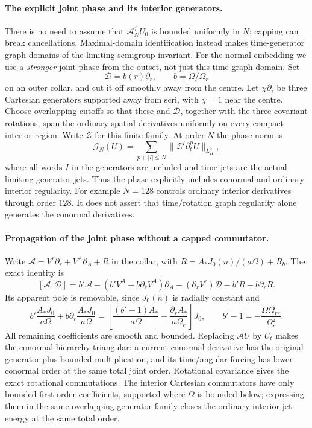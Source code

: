 \paragraph{The explicit joint phase and its interior generators.}
There is no need to assume that $\mathcal A_N^jU_0$ is bounded uniformly in
$N$; capping can break cancellations.  Maximal-domain identification instead
makes time-generator graph domains of the limiting semigroup invariant.
For the normal embedding we use a \emph{stronger} joint phase from the outset,
not just this time graph domain.  Set
\[
 \mathcal D=b(r)\partial_r,\qquad b=\Omega/\Omega_r
\]
on an outer collar, and cut it off smoothly away from the centre.  Let
$\chi\partial_i$ be three Cartesian generators supported away from scri,
with $\chi=1$ near the centre.  Choose overlapping cutoffs so that these
and $\mathcal D$, together with the three covariant rotations, span the
ordinary spatial derivatives uniformly on every compact interior region.
Write $\mathcal Z$ for this finite family.  At order $N$ the phase norm is
\[
 \mathcal G_N(U)=\sum_{p+|I|\le N}
  \|\mathcal Z^I\partial_t^pU\|_{L^2_H},
\]
where all words $I$ in the generators are included and time jets are the
actual limiting-generator jets.  Thus the phase explicitly includes
conormal and ordinary interior regularity.  For example $N=128$ controls
ordinary interior derivatives through order $128$.  It does not assert that
time/rotation graph regularity alone generates the conormal derivatives.

\paragraph{Propagation of the joint phase without a capped commutator.}
Write $\mathcal A=V^r\partial_r+V^A\partial_A+R$ in the collar, with
$R=A_*J_0(n)/(a\Omega)+R_b$.  The exact identity is
\[
 [\mathcal A,\mathcal D]=b'\mathcal A
 -(b'V^A+b\partial_rV^A)\partial_A
 -(\partial_rV^r)\mathcal D-b'R-b\partial_rR.
\]
Its apparent pole is removable, since $J_0(n)$ is radially constant and
\[
 b'\frac{A_*J_0}{a\Omega}
 +b\partial_r\frac{A_*J_0}{a\Omega}
 =\left[\frac{(b'-1)A_*}{a\Omega}
       +\frac{\partial_rA_*}{a\Omega_r}\right]J_0,
 \qquad b'-1=-\frac{\Omega\Omega_{rr}}{\Omega_r^2}.
\]
All remaining coefficients are smooth and bounded.  Replacing
$\mathcal AU$ by $U_t$ makes the conormal hierarchy triangular: a current
conormal derivative has the original generator plus bounded multiplication,
and its time/angular forcing has lower conormal order at the same total
joint order.  Rotational covariance gives the exact rotational commutations.
The interior Cartesian commutators have only bounded first-order
coefficients, supported where $\Omega$ is bounded below; expressing them in
the same overlapping generator family closes the ordinary interior jet
energy at the same total order.

